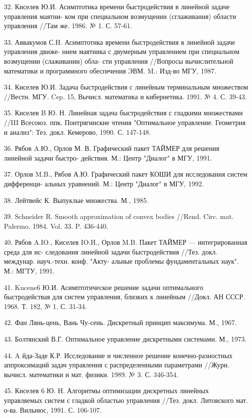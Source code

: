 \documentclass[10pt]{article}
\begin{document}
32. Киселев Ю.И. Асимптотика времени быстродействия в линейной задаче управления маятни- ком при специальном возмущении (сглаживания) области управления //Там же. 1986. № 1. С. 57-61.

33. Аввакумов С.H. Асимптотика времени быстродействия в линейной задаче управления движе- нием маятника с двумерным управлением при специальном возмущении (слаживании) обла- сти управления //Вопросы вычислительной математики и программного обеспечения ЭВМ. M.: Изд-во МГУ, 1987.

34. Киселев Ю.И. Задача быстродействия с линейным терминальным множеством //Вестн. МГУ. Cep. 15, Вычисл. математика и кибернетика. 1991. № 4. С. 39-43.

35. Киселев B Ю. Н. Линейная задача быстродействия с гладкими множествами //III Всесоюз. ппк. Понтрягинские чтения "Оптимальное управление. Геометрия и анализ": Тез. докл. Кемерово, 1990. С. 147-148.

36. Рябов A.Ю., Орлов М. В. Графический пакет ТАЙМЕР для решения линейной задачи быстро- действия. М.: Центр "Диалог" в МГУ, 1991.

37. Орлов M.B., Рябов А.Ю. Графический пакет КОШИ для исследования систем дифференци- альных уравнений. М.: Центр "Диалог" в МГУ, 1992.

38. Лейтвейс К. Выпуклые множества. М., 1985.

39. Schneider R. Smooth approximation of convex bodies //Rend. Circ. mat. Palermo. 1984. Vol. 33. P. 436-440.

40. Рябов A.IO., Киселев IO.H., Орлов M.B. Пакет ТАЙМЕР — интегрированная среда для ис- следования линейной задачи быстродействия //Тез. докл. междунар. науч.-техн. конф. "Акту- альные проблемы фундаментальных наук". М.: МГТУ, 1991.

41. Kucene6 Ю.И. Асимптотическое решение задачи оптимального быстродействая для систем управления, близких к линейным //Докл. АН СССР. 1968. Т. 182, № 1. С. 31-34.

42. Фан Лянь-цень, Вань Чу-сень. Дискретный принцип максимума. М., 1967.

43. Болтянский В.Г. Оптимальное управление дискретными системами. М., 1973.

44. A йда-Заде К.Р. Исследование и численное решение конечно-разностных аппроксимаций задач управления с распределенными параметрами //Журн. вычисл. математики и мат. физики. 1989. № 3. С. 346-354.

45. Киселев 6 Ю. Н. Алгоритмы оптимизации дискретных линейных управляемых систем с гладкой областью управления //Тез. докл. Литовского мат. о-ва. Вильнюс, 1991. С. 106-107.
\end{document}
